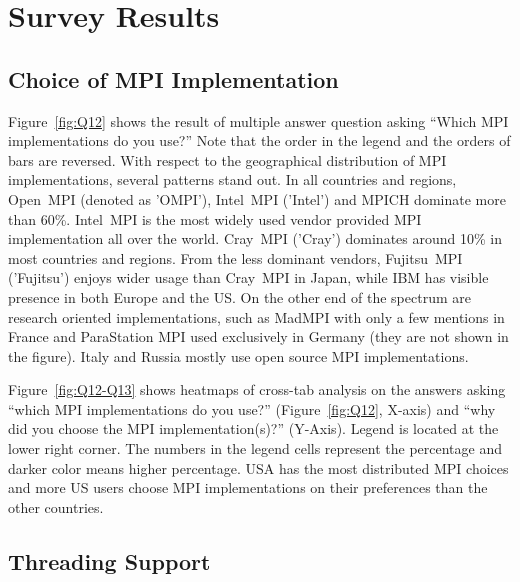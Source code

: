 \documentclass[sigconf,nonacm]{acmart}
\begin{document}
\section{Survey Results}

\subsection{Choice of MPI Implementation}

Figure~\ref{fig:Q12} shows the result of multiple answer question
asking ``Which MPI implementations do you use?'' Note that the order
in the legend and the orders of bars are reversed. 
With respect to the geographical distribution of MPI implementations,
several patterns stand out. In all countries and regions, Open~MPI
(denoted as 'OMPI'),
Intel~MPI ('Intel') and MPICH dominate more than 60\%. Intel~MPI is
the most 
widely used vendor provided MPI implementation all over the
world. Cray~MPI ('Cray') dominates around 10\% in most countries and
regions. From the less dominant vendors, Fujitsu~MPI ('Fujitsu')
enjoys wider usage than Cray~MPI in Japan, while IBM has visible
presence in both Europe and the US. 
On the other end of the spectrum are research oriented
implementations, such as MadMPI with only a few mentions in
France and ParaStation MPI used exclusively in
Germany (they are not shown in the figure). Italy and Russia mostly
use open source MPI implementations.

Figure~\ref{fig:Q12-Q13} shows heatmaps of cross-tab analysis on the
answers asking ``which MPI implementations do you use?''
(Figure~\ref{fig:Q12}, X-axis) and ``why did you choose the MPI
implementation(s)?'' (Y-Axis). Legend is located at the lower right
corner. The numbers in the legend cells represent the
percentage and darker color means higher percentage. USA has the most
distributed MPI choices and more US users choose MPI implementations
on their preferences than the other countries.
  
\subsection{Threading Support}
\end{document}
